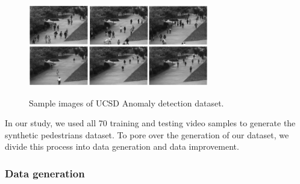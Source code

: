 \begin{figure}[H]
	\centering
	{\includegraphics[width=0.7\textwidth]{images/anomaly}}
	\caption{Sample images of UCSD Anomaly detection dataset.}
	\label{fig:anomaly}
\end{figure}


\indent In our study, we used all 70 training and testing video samples to generate the synthetic pedestrians dataset. To pore over the generation of our dataset, we divide this process into data generation and data improvement.

  
\subsubsection{Data generation}

